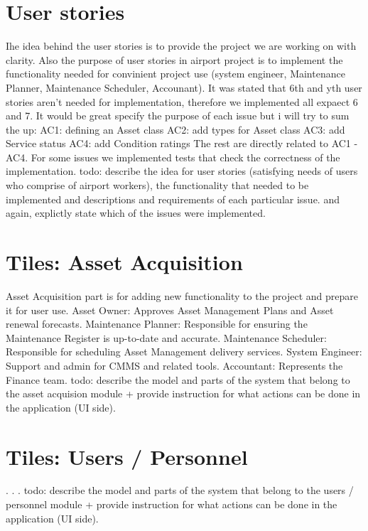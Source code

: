 \documentclass[a4paper, 12pt, final]{hitec}
\begin{document}
  \section{User stories}\label{sec:03}
  Ihe idea behind the user stories is to provide the project we are working on with clarity. 
  Also the purpose of user stories in airport project is to implement the functionality needed
  for convinient project use (system engineer, Maintenance Planner, Maintenance Scheduler, Accounant).
  It was stated that 6th and yth user stories aren't needed for implementation, therefore we implemented all expaect 6 and 7.
  It would be great specify the purpose of each issue but i will try to sum the up:
  AC1: defining an Asset class 
  AC2: add types for Asset class
  AC3: add Service status
  AC4: add Condition ratings
  The rest are directly related to AC1 - AC4.
  For some issues we implemented tests that check the correctness of the implementation.
  todo: describe the idea for user stories (satisfying needs of users
  who comprise of airport workers), the functionality that needed to be
  implemented and descriptions and requirements of each particular issue.
  and again, explictly state which of the issues were implemented.
  \clearpage

  \section{Tiles: Asset Acquisition}\label{sec:04}
  Asset Acquisition part is for adding new functionality to the project and 
  prepare it for user use.
  Asset Owner: Approves Asset Management Plans and Asset renewal forecasts.
  Maintenance Planner: Responsible for ensuring the Maintenance Register is up-to-date and accurate.
  Maintenance Scheduler: Responsible for scheduling Asset Management delivery services.
  System Engineer: Support and admin for CMMS and related tools.
  Accountant: Represents the Finance team.
  todo: describe the model and parts of the system that belong
  to the asset acquision module + provide instruction for what
  actions can be done in the application (UI side).
  \clearpage

  \section{Tiles: Users / Personnel}\label{sec:05}
  .
  .
  .
  todo: describe the model and parts of the system that belong
  to the users / personnel module + provide instruction for what
  actions can be done in the application (UI side).
  \clearpage
\end{document}
